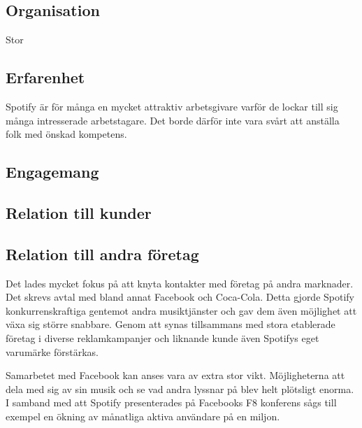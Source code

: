 \subsection{Organisation}
Stor

\subsection{Erfarenhet}
Spotify är för många en mycket attraktiv arbetsgivare varför de lockar till sig många intresserade arbetstagare. Det borde därför inte vara svårt att anställa folk med önskad kompetens. 

\subsection{Engagemang}

\subsection{Relation till kunder}

\subsection{Relation till andra företag}
Det lades mycket fokus på att knyta kontakter med företag på andra marknader. Det skrevs avtal med bland annat Facebook och Coca-Cola. Detta gjorde Spotify konkurrenskraftiga gentemot andra musiktjänster och gav dem även möjlighet att växa sig större snabbare. Genom att synas tillsammans med stora etablerade företag i diverse reklamkampanjer och liknande kunde även Spotifys eget varumärke förstärkas. 

Samarbetet med Facebook kan anses vara av extra stor vikt. Möjligheterna att dela med sig av sin musik och se vad andra lyssnar på blev helt plötsligt enorma. I samband med att Spotify presenterades på Facebooks F8 konferens sågs till exempel en ökning av månatliga aktiva användare på en miljon. 

